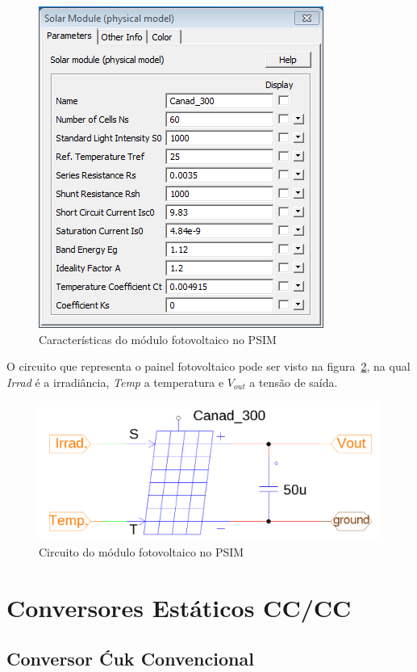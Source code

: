 \documentclass[
	12pt,				%
	openright,			%
	onseside,
	a4paper,			%
	english,			%
	french,				%
	spanish,			%
	brazil,				%
	]{abntex2}
\begin{document}
\begin{figure}[htbp]%
	\begin{center}%
		\includegraphics[width=0.55 \linewidth]{PV_carac}
		\caption{Características do módulo fotovoltaico no PSIM}
		\label{fig:pv_psim_carac}
	\end{center}
\end{figure}

O circuito que representa o painel fotovoltaico pode ser visto na figura~\ref{fig:pv_psim_circuit}, na qual \textit{Irrad} é a irradiância, \textit{Temp} a temperatura e $V_{out}$ a tensão de saída.

\begin{figure}[htbp]%
	\begin{center}%
		\includegraphics[width=0.55 \linewidth]{pv_psim_circuit}
		\caption{Circuito do módulo fotovoltaico no PSIM}
		\label{fig:pv_psim_circuit}
	\end{center}
\end{figure}


\section{Conversores Estáticos CC/CC} \label{sec:met_conv_cc}

\subsection{Conversor Ćuk Convencional}
\end{document}
